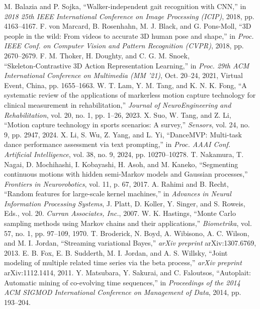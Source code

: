 \documentclass[conference]{IEEEtran}
\begin{document}
\begin{thebibliography}{00}
 M. Balazia and P. Sojka, ``Walker-independent gait recognition with CNN,'' in \textit{2018 25th IEEE International Conference on Image Processing (ICIP)}, 2018, pp. 4163--4167.
 F. von Marcard, B. Rosenhahn, M. J. Black, and G. Pons-Moll, ``3D people in the wild: From videos to accurate 3D human pose and shape,'' in \textit{Proc. IEEE Conf. on Computer Vision and Pattern Recognition (CVPR)}, 2018, pp. 2670--2679.
 F. M. Thoker, H. Doughty, and C. G. M. Snoek, “Skeleton‑Contrastive 3D Action Representation Learning,” in \textit{Proc. 29th ACM International Conference on Multimedia (MM ’21)}, Oct. 20--24, 2021, Virtual Event, China, pp. 1655--1663.
 W. T. Lam, Y. M. Tang, and K. N. K. Fong, “A systematic review of the applications of markerless motion capture technology for clinical measurement in rehabilitation,” \textit{Journal of NeuroEngineering and Rehabilitation}, vol. 20, no. 1, pp. 1--26, 2023.
 X. Suo, W. Tang, and Z. Li, “Motion capture technology in sports scenarios: A survey,” \textit{Sensors}, vol. 24, no. 9, pp. 2947, 2024.
 X. Li, S. Wu, Z. Yang, and L. Yi, ``DanceMVP: Multi-task dance performance assessment via text prompting,'' in \textit{Proc. AAAI Conf. Artificial Intelligence}, vol. 38, no. 9, 2024, pp. 10270--10278.
 T. Nakamura, T. Nagai, D. Mochihashi, I. Kobayashi, H. Asoh, and M. Kaneko, “Segmenting continuous motions with hidden semi-Markov models and Gaussian processes,” \textit{Frontiers in Neurorobotics}, vol. 11, p. 67, 2017.
 A. Rahimi and B. Recht, “Random features for large-scale kernel machines,” in \textit{Advances in Neural Information Processing Systems}, J. Platt, D. Koller, Y. Singer, and S. Roweis, Eds., vol. 20. \textit{Curran Associates, Inc.}, 2007.
 W. K. Hastings, “Monte Carlo sampling methods using Markov chains and their applications,” \textit{Biometrika}, vol. 57, no. 1, pp. 97--109, 1970.
 T. Broderick, N. Boyd, A. Wibisono, A. C. Wilson, and M. I. Jordan, “Streaming variational Bayes,” \textit{arXiv preprint} arXiv:1307.6769, 2013.
 E. B. Fox, E. B. Sudderth, M. I. Jordan, and A. S. Willsky, “Joint modeling of multiple related time series via the beta process,” \textit{arXiv preprint} arXiv:1112.1414, 2011.
 Y. Matsubara, Y. Sakurai, and C. Faloutsos, “Autoplait: Automatic mining of co-evolving time sequences,” in \textit{Proceedings of the 2014 ACM SIGMOD International Conference on Management of Data}, 2014, pp. 193--204.

\end{thebibliography}
\end{document}

